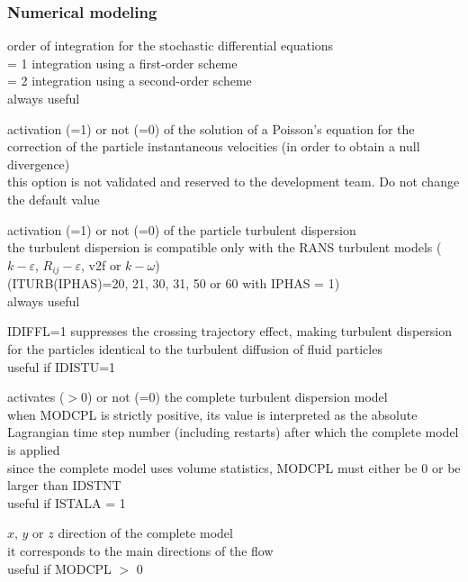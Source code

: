 \subsubsection{Numerical modeling}

{order of integration for the stochastic differential equations\\
\hspace*{1.3cm} = 1 integration using a first-order scheme\\
\hspace*{1.3cm} = 2 integration using a second-order scheme\\
always useful}

{activation (=1) or not (=0) of the solution of a Poisson's equation for
the correction of the particle instantaneous velocities (in order to obtain a
null divergence)\\
this option is not validated and reserved to the development team. Do not change
the default value}

{activation (=1) or not (=0) of the particle turbulent dispersion\\
the turbulent dispersion is compatible only with the RANS turbulent models
($k-\varepsilon$, $R_{ij}-\varepsilon$, v2f or $k-\omega$)\\
(ITURB(IPHAS)=20, 21, 30, 31, 50 or 60 with IPHAS = 1)\\
always useful}

{IDIFFL=1 suppresses the crossing trajectory effect, making turbulent dispersion
for the particles identical to the turbulent diffusion of fluid particles\\
useful if IDISTU=1}

{activates ($>$0) or not (=0) the complete turbulent dispersion model\\
when MODCPL is strictly positive, its value is interpreted as the absolute
Lagrangian time step number (including restarts) after which the complete model
is applied\\
since the complete model uses volume statistics, MODCPL must either be 0 or be
larger than IDSTNT\\
useful if ISTALA = 1}

{$x$, $y$ or $z$ direction of the complete model\\
it corresponds to the main directions of the flow\\
useful if MODCPL $>$ 0}

